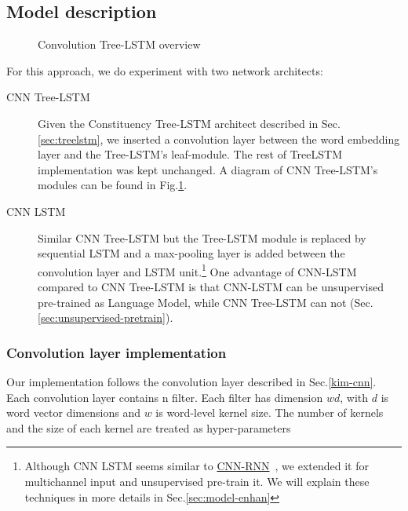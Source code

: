 \subsection{Model description}
\begin{figure}[H]
    \centering
    \caption[Convolution Tree-LSTM overview]{Convolution Tree-LSTM overview}
    \label{fig:convtreelstmsummary}
\end{figure}
For this approach, we do experiment with two network architects:
\begin{description}
\item[CNN Tree-LSTM] Given the Constituency Tree-LSTM architect described in Sec.\ref{sec:treelstm},  we inserted a convolution layer between the word embedding layer and the Tree-LSTM's leaf-module.
The rest of TreeLSTM implementation was kept unchanged.
A diagram of CNN Tree-LSTM's modules can be found in Fig.\ref{fig:convtreelstmsummary}.
\item[CNN LSTM] Similar CNN Tree-LSTM but the Tree-LSTM module is replaced by sequential LSTM and a max-pooling layer is added between the convolution layer and LSTM unit.\footnote{Although CNN LSTM seems similar to \hyperref[cnn-rnn]{CNN-RNN}~\cite{cnn-rnn}, we extended it for multichannel input and unsupervised pre-train it. We will explain these techniques in more details in Sec.\ref{sec:model-enhan}}
One advantage of CNN-LSTM compared to CNN Tree-LSTM is that CNN-LSTM can be unsupervised pre-trained as Language Model, while CNN Tree-LSTM can not (Sec.\ref{sec:unsupervised-pretrain}).
\end{description}


\subsubsection{Convolution layer implementation} \label{sec:conv1c}
Our implementation follows the convolution layer described in Sec.\ref{kim-cnn}.
Each convolution layer contains n filter.
Each filter has dimension $wd$, with \(d\) is word vector dimensions and \(w\) is word-level kernel size.
The number of kernels and the size of each kernel are treated as hyper-parameters

